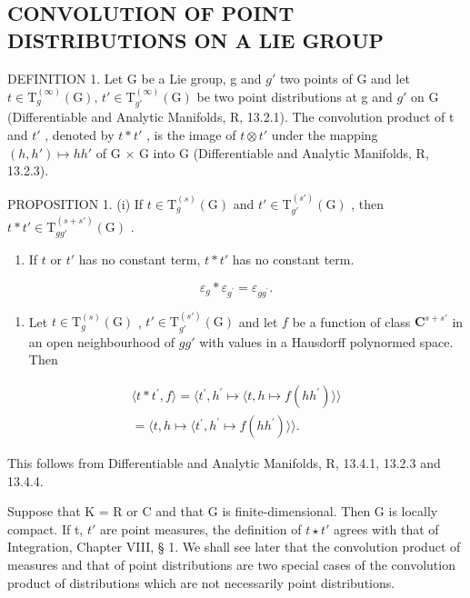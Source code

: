 \subsection{CONVOLUTION OF POINT DISTRIBUTIONS ON A LIE GROUP}

DEFINITION 1. Let G be a Lie group, g and \(g'\) two points of G and let \(t \in \mathrm{T}_{g}^{(\infty)}(\mathrm{G})\), \(t' \in \mathrm{T}_{g'}^{(\infty)}(\mathrm{G})\) be two point distributions at g and \(g'\) on G (Differentiable and Analytic Manifolds, R, 13.2.1). The convolution product of t and \(t'\) , denoted by \(t * t'\) , is the image of \(t \otimes t'\) under the mapping \((h, h') \mapsto hh'\) of G × G into G (Differentiable and Analytic Manifolds, R, 13.2.3).

PROPOSITION 1. (i) If \(t \in \mathrm{T}_g^{(s)}(\mathrm{G})\) and \(t' \in \mathrm{T}_{g'}^{(s')}(\mathrm{G})\) , then \(t * t' \in \mathrm{T}_{gg'}^{(s + s')}(\mathrm{G})\) .

\begin{enumerate}
\def\labelenumi{(\roman{enumi})}
\setcounter{enumi}{1}
\tightlist
\item
  If \(t\) or \(t'\) has no constant term, \(t * t'\) has no constant term.
\end{enumerate}

\[
\varepsilon_ {g} * \varepsilon_ {g ^ {\prime}} = \varepsilon_ {g g ^ {\prime}}.
\]

\begin{enumerate}
\def\labelenumi{(\roman{enumi})}
\setcounter{enumi}{3}
\tightlist
\item
  Let \(t \in \mathrm{T}_g^{(s)}(\mathrm{G})\) , \(t' \in \mathrm{T}_{g'}^{(s')}(\mathrm{G})\) and let \(f\) be a function of class \(\mathbf{C}^{s + s'}\) in an open neighbourhood of \(gg'\) with values in a Hausdorff polynormed space. Then
\end{enumerate}

\[
\begin{array}{c} \langle t * t ^ {\prime}, f \rangle = \langle t ^ {\prime}, h ^ {\prime} \mapsto \langle t, h \mapsto f (h h ^ {\prime}) \rangle \rangle \\ = \langle t, h \mapsto \langle t ^ {\prime}, h ^ {\prime} \mapsto f (h h ^ {\prime}) \rangle \rangle . \end{array}
\]

This follows from Differentiable and Analytic Manifolds, R, 13.4.1, 13.2.3 and 13.4.4.

Suppose that K = R or C and that G is finite-dimensional. Then G is locally compact. If t, \(t'\) are point measures, the definition of \(t \star t'\) agrees with that of Integration, Chapter VIII, § 1. We shall see later that the convolution product of measures and that of point distributions are two special cases of the convolution product of distributions which are not necessarily point distributions.

